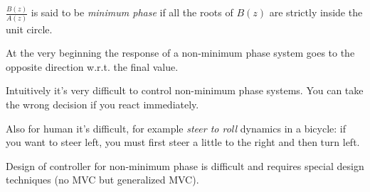 \begin{remark}
    $\frac{B(z)}{A(z)}$ is said to be \emph{minimum phase} if all the roots of $B(z)$ are strictly inside the unit circle.

    \begin{figure}[H]
        \centering
    \end{figure}

    At the very beginning the response of a non-minimum phase system goes to the opposite direction w.r.t. the final value.


    Intuitively it's very difficult to control non-minimum phase systems.
    You can take the wrong decision if you react immediately.

    Also for human it's difficult, for example \emph{steer to roll} dynamics in a bicycle: if you want to steer left, you must first steer a little to the right and then turn left.

    Design of controller for non-minimum phase is difficult and requires special design techniques (no MVC but generalized MVC).
\end{remark}

